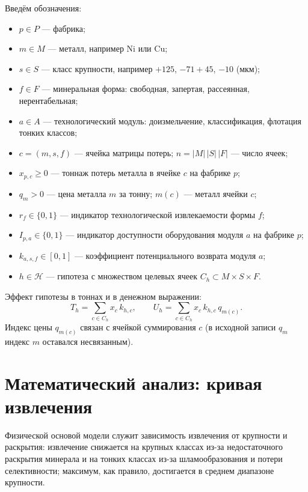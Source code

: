 \documentclass[12pt,a4paper]{article}
\newcommand{\Hyp}{\mathcal{H}}
\begin{document}
Введём обозначения:
\begin{itemize}
  \item \(p \in P\) --- фабрика;
  \item \(m \in M\) --- металл, например \(\mathrm{Ni}\) или \(\mathrm{Cu}\);
  \item \(s \in S\) --- класс крупности, например \(+125\), \(-71{+}45\), \(-10\) (мкм);
  \item \(f \in F\) --- минеральная форма: свободная, запертая, рассеянная, нерентабельная;
  \item \(a \in A\) --- технологический модуль: доизмельчение, классификация, флотация тонких классов;
  \item \(c = (m,s,f)\) --- ячейка матрицы потерь; \(n = |M|\,|S|\,|F|\) --- число ячеек;
  \item \(x_{p,c} \ge 0\) --- тоннаж потерь металла в ячейке \(c\) на фабрике \(p\);
  \item \(q_m > 0\) --- цена металла \(m\) за тонну; \(m(c)\) --- металл ячейки \(c\);
  \item \(r_f \in \{0,1\}\) --- индикатор технологической извлекаемости формы \(f\);
  \item \(I_{p,a} \in \{0,1\}\) --- индикатор доступности оборудования модуля \(a\) на фабрике \(p\);
  \item \(k_{a,s,f} \in [0,1]\) --- коэффициент потенциального возврата модуля \(a\);
  \item \(h \in \Hyp\) --- гипотеза с множеством целевых ячеек \(C_h \subset M \times S \times F\).
\end{itemize}

Эффект гипотезы в тоннах и в денежном выражении:
\[
  T_h = \sum_{c \in C_h} x_c\, k_{h,c},
  \qquad
  U_h = \sum_{c \in C_h} x_c\, k_{h,c}\, q_{m(c)}.
\]
Индекс цены \(q_{m(c)}\) связан с ячейкой суммирования \(c\)
(в исходной записи \(q_m\) индекс \(m\) оставался несвязанным).

\section{Математический анализ: кривая извлечения}

Физической основой модели служит зависимость извлечения от крупности и
раскрытия: извлечение снижается на крупных классах из-за недостаточного
раскрытия минерала и на тонких классах из-за шламообразования и потери
селективности; максимум, как правило, достигается в среднем диапазоне
крупности.
\end{document}
